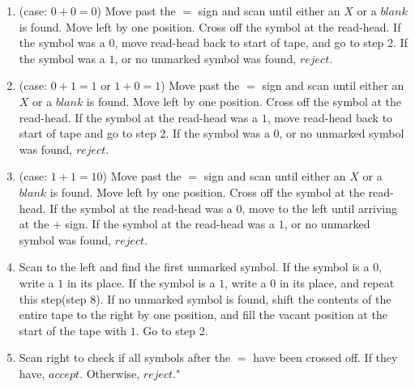 \documentclass{article}
\begin{document}
\begin{enumerate}[\indent a)]
\begin{enumerate}[\indent 1.]
		\item (case: $0 + 0 = 0$) Move past the $=$ sign and scan until either an $X$ or a $blank$ is found. Move left by one position. Cross off the symbol at the read-head. If the symbol was a $0$, move read-head back to start of tape, and go to step 2. If the symbol was a $1$, or no unmarked symbol was found, $reject$.
		
		\item (case: $0 + 1 = 1$ or $1 + 0 = 1$) Move past the $=$ sign and scan until either an $X$ or a $blank$ is found. Move left by one position. Cross off the symbol at the read-head. If the symbol at the read-head was a $1$, move read-head back to start of tape and go to step 2. If the symbol was a $0$, or no unmarked symbol was found, $reject$.
		
		\item (case: $1 + 1 = 10$) Move past the $=$ sign and scan until either an $X$ or a $blank$ is found. Move left by one position. Cross off the symbol at the read-head. If the symbol at the read-head was a $0$, move to the left until arriving at the $+$ sign. If the symbol at the read-head was a $1$, or no unmarked symbol was found, $reject$.
		
		\item Scan to the left and find the first unmarked symbol. If the symbol is a $0$, write a $1$ in its place. If the symbol is a $1$, write a $0$ in its place, and repeat this step(step 8). If no unmarked symbol is found, shift the contents of the entire tape to the right by one position, and fill the vacant position at the start of the tape with $1$. Go to step 2.
		
		\item Scan right to check if all symbols after the $=$ have been crossed off. If they have, $accept$. Otherwise, $reject$."
		 		
    \end{enumerate}

\newpage

\end{enumerate}
\end{document}
